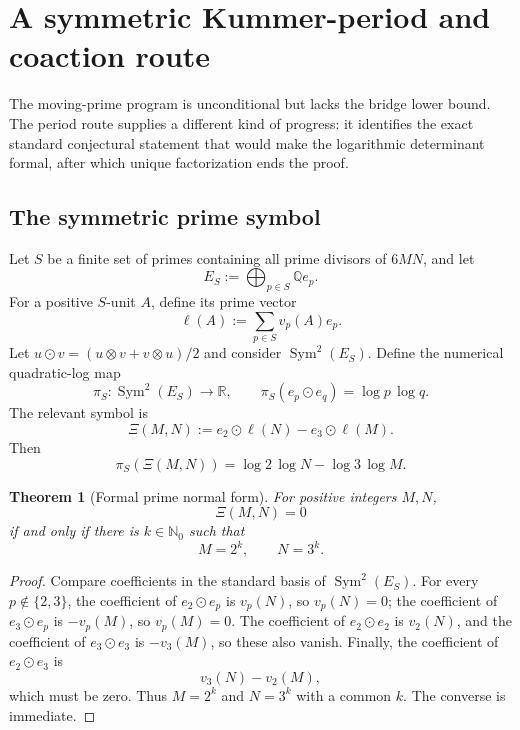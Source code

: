 \documentclass[11pt]{article}
\newtheorem{theorem}{Theorem}[section]
\theoremstyle{definition}
\theoremstyle{remark}
\newcommand{\N}{\mathbb N}
\newcommand{\Q}{\mathbb Q}
\newcommand{\R}{\mathbb R}
\newcommand{\Sym}{\operatorname{Sym}}
\begin{document}
\section{A symmetric Kummer-period and coaction route}

The moving-prime program is unconditional but lacks the bridge lower bound.
The period route supplies a different kind of progress: it identifies the
exact standard conjectural statement that would make the logarithmic
determinant formal, after which unique factorization ends the proof.

\subsection{The symmetric prime symbol}

Let $S$ be a finite set of primes containing all prime divisors of $6MN$, and
let
\[
 E_S:=\bigoplus_{p\in S}\Q e_p.
\]
For a positive $S$-unit $A$, define its prime vector
\[
 \ell(A):=\sum_{p\in S}v_p(A)e_p.
\]
Let $u\odot v=(u\otimes v+v\otimes u)/2$ and consider
$\Sym^2(E_S)$.  Define the numerical quadratic-log map
\begin{equation}\label{eq:period-map-symbol}
 \pi_S:\Sym^2(E_S)\longrightarrow\R,
 \qquad
 \pi_S(e_p\odot e_q)=\log p\,\log q.
\end{equation}
The relevant symbol is
\begin{equation}\label{eq:Xi}
 \Xi(M,N):=e_2\odot\ell(N)-e_3\odot\ell(M).
\end{equation}
Then
\begin{equation}\label{eq:piXi}
 \pi_S(\Xi(M,N))
 =\log2\,\log N-\log3\,\log M.
\end{equation}

\begin{theorem}[Formal prime normal form]\label{thm:formal-normal-form}
For positive integers $M,N$,
\[
 \Xi(M,N)=0
\]
if and only if there is $k\in\N_0$ such that
\[
 M=2^k,\qquad N=3^k.
\]
\end{theorem}

\begin{proof}
Compare coefficients in the standard basis of $\Sym^2(E_S)$.  For every
$p\notin\{2,3\}$, the coefficient of $e_2\odot e_p$ is $v_p(N)$, so
$v_p(N)=0$; the coefficient of $e_3\odot e_p$ is $-v_p(M)$, so
$v_p(M)=0$.  The coefficient of $e_2\odot e_2$ is $v_2(N)$, and the
coefficient of $e_3\odot e_3$ is $-v_3(M)$, so these also vanish.  Finally,
the coefficient of $e_2\odot e_3$ is
\[
 v_3(N)-v_2(M),
\]
which must be zero.  Thus $M=2^k$ and $N=3^k$ with a common $k$.  The converse
is immediate.
\end{proof}
\end{document}
